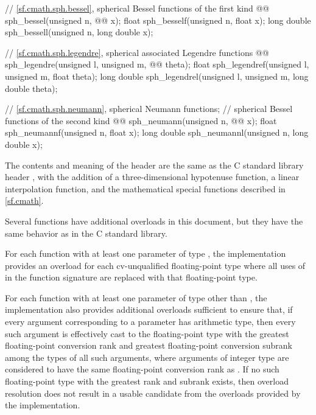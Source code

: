 \begin{codeblock}
{  // \ref{sf.cmath.sph.bessel}, spherical Bessel functions of the first kind
  @@ sph_bessel(unsigned n, @@ x);
  float               sph_besself(unsigned n, float x);
  long double         sph_bessell(unsigned n, long double x);

  // \ref{sf.cmath.sph.legendre}, spherical associated Legendre functions
  @@ sph_legendre(unsigned l, unsigned m, @@ theta);
  float               sph_legendref(unsigned l, unsigned m, float theta);
  long double         sph_legendrel(unsigned l, unsigned m, long double theta);

  // \ref{sf.cmath.sph.neumann}, spherical Neumann functions;
  // spherical Bessel functions of the second kind
  @@ sph_neumann(unsigned n, @@ x);
  float               sph_neumannf(unsigned n, float x);
  long double         sph_neumannl(unsigned n, long double x);
}
\end{codeblock}

\pnum
The contents and meaning of the header 
are the same as the C standard library header ,
with the addition of
a three-dimensional hypotenuse function,
a linear interpolation function, and
the mathematical special functions described in \ref{sf.cmath}.
\begin{note}
Several functions have additional overloads in this document,
but they have the same behavior as in the C standard library.
\end{note}

\pnum
For each function
with at least one parameter of type ,
the implementation provides
an overload for each cv-unqualified floating-point type
where all uses of  in the function signature
are replaced with that floating-point type.

\pnum
For each function
with at least one parameter of type 
other than ,
the implementation also provides additional overloads sufficient to ensure that,
if every argument corresponding to
a  parameter has arithmetic type,
then every such argument is effectively cast to the floating-point type
with the greatest floating-point conversion rank and
greatest floating-point conversion subrank
among the types of all such arguments,
where arguments of integer type are considered to have
the same floating-point conversion rank as .
If no such floating-point type with the greatest rank and subrank exists,
then overload resolution does not result in
a usable candidate
from the overloads provided by the implementation.

